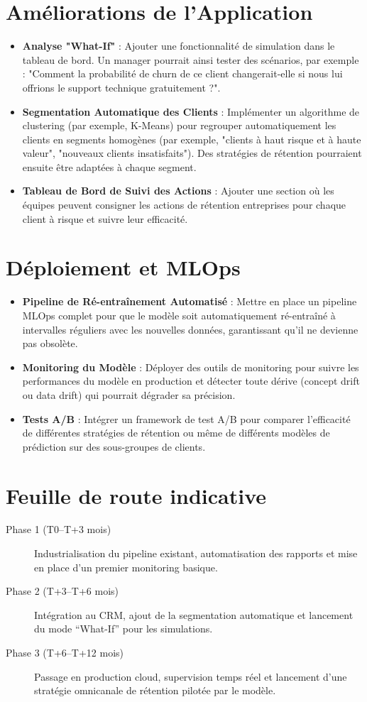 \section{Améliorations de l'Application}
\begin{itemize}
    \item \textbf{Analyse "What-If"} : Ajouter une fonctionnalité de simulation dans le tableau de bord. Un manager pourrait ainsi tester des scénarios, par exemple : "Comment la probabilité de churn de ce client changerait-elle si nous lui offrions le support technique gratuitement ?".
    \item \textbf{Segmentation Automatique des Clients} : Implémenter un algorithme de clustering (par exemple, K-Means) pour regrouper automatiquement les clients en segments homogènes (par exemple, "clients à haut risque et à haute valeur", "nouveaux clients insatisfaits"). Des stratégies de rétention pourraient ensuite être adaptées à chaque segment.
    \item \textbf{Tableau de Bord de Suivi des Actions} : Ajouter une section où les équipes peuvent consigner les actions de rétention entreprises pour chaque client à risque et suivre leur efficacité.
\end{itemize}

\section{Déploiement et MLOps}
\begin{itemize}
    \item \textbf{Pipeline de Ré-entraînement Automatisé} : Mettre en place un pipeline MLOps complet pour que le modèle soit automatiquement ré-entraîné à intervalles réguliers avec les nouvelles données, garantissant qu'il ne devienne pas obsolète.
    \item \textbf{Monitoring du Modèle} : Déployer des outils de monitoring pour suivre les performances du modèle en production et détecter toute dérive (concept drift ou data drift) qui pourrait dégrader sa précision.
    \item \textbf{Tests A/B} : Intégrer un framework de test A/B pour comparer l'efficacité de différentes stratégies de rétention ou même de différents modèles de prédiction sur des sous-groupes de clients.
\end{itemize}

\section{Feuille de route indicative}
\begin{description}
    \item[Phase 1 (T0--T+3 mois)] Industrialisation du pipeline existant, automatisation des rapports et mise en place d'un premier monitoring basique.
    \item[Phase 2 (T+3--T+6 mois)] Intégration au CRM, ajout de la segmentation automatique et lancement du mode ``What-If'' pour les simulations.
    \item[Phase 3 (T+6--T+12 mois)] Passage en production cloud, supervision temps réel et lancement d'une stratégie omnicanale de rétention pilotée par le modèle.
\end{description}


